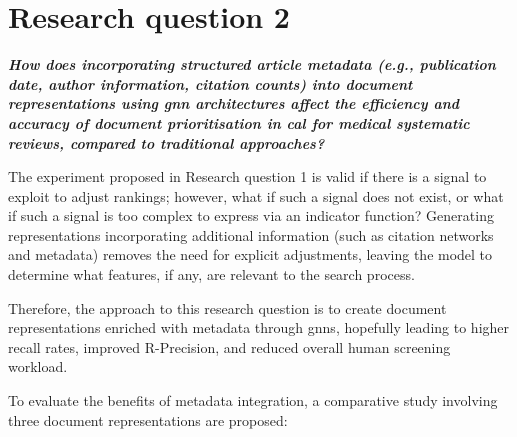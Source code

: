 \documentclass[10pt,oneside]{book}
\begin{document}
\section{Research question 2}
\begin{tcolorbox}[colback=lightgreen!10, colframe=lightgreen, sharp corners=southwest, boxrule=0.8pt]
\emph{\textbf{How does incorporating structured article metadata (e.g., publication date, author information, citation counts) into document representations using \gls*{gnn} architectures affect the efficiency and accuracy of document prioritisation in \gls*{cal} for medical systematic reviews, compared to traditional approaches?}}
\end{tcolorbox}

The experiment proposed in Research question 1 is valid if there is a signal to exploit to adjust rankings; however, what if such a signal does not exist, or what if such a signal is too complex to express via an indicator function? Generating representations incorporating additional information (such as citation networks and metadata) removes the need for explicit adjustments, leaving the model to determine what features, if any, are relevant to the search process.

Therefore, the approach to this research question is to create document representations enriched with metadata through \glspl*{gnn}, hopefully leading to higher recall rates, improved R-Precision, and reduced overall human screening workload.

To evaluate the benefits of metadata integration, a comparative study involving three document representations are proposed:
\end{document}
